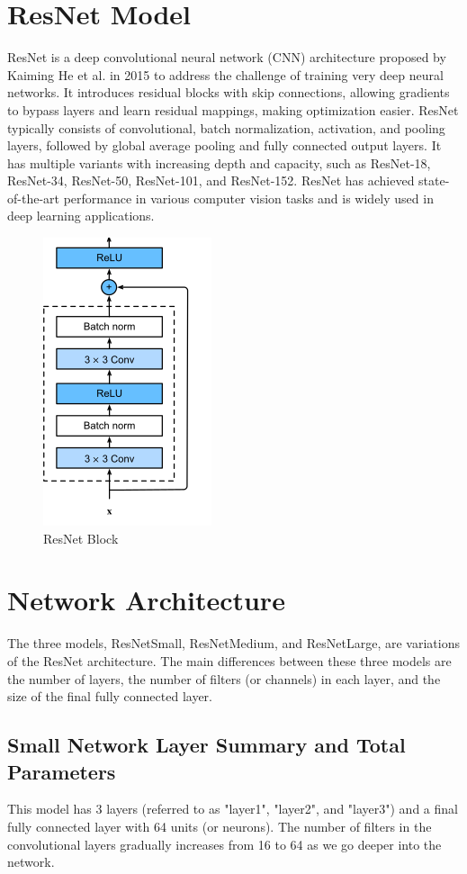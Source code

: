 \documentclass[letterpaper]{article} %
\begin{document}
\section{ResNet Model}
ResNet is a deep convolutional neural network (CNN) architecture proposed by Kaiming He et al. in 2015 \cite{c:24} to address the challenge of training very deep neural networks. It introduces residual blocks with skip connections, allowing gradients to bypass layers and learn residual mappings, making optimization easier. ResNet typically consists of convolutional, batch normalization, activation, and pooling layers, followed by global average pooling and fully connected output layers. It has multiple variants with increasing depth and capacity, such as ResNet-18, ResNet-34, ResNet-50, ResNet-101, and ResNet-152. ResNet has achieved state-of-the-art performance in various computer vision tasks and is widely used in deep learning applications.

\begin{figure}[htbp]
\captionsetup[subfigure]{justification=centering}
  \centering
  \includegraphics[scale = 0.5]{image/resnet-block.png}
  \caption{ResNet Block}
\end{figure}

\section{Network Architecture}
The three models, ResNetSmall, ResNetMedium, and ResNetLarge, are variations of the ResNet architecture. The main differences between these three models are the number of layers, the number of filters (or channels) in each layer, and the size of the final fully connected layer.
\subsection{Small Network Layer Summary and Total Parameters}
This model has 3 layers (referred to as "layer1", "layer2", and "layer3") and a final fully connected layer with 64 units (or neurons). The number of filters in the convolutional layers gradually increases from 16 to 64 as we go deeper into the network.
\end{document}
